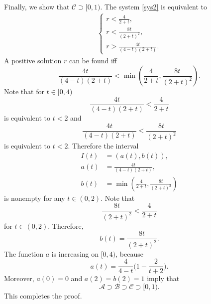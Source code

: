 \documentclass[reqno]{amsart}
\begin{document}
Finally, we show that $\mathcal C \supset [0,1)$.
The system \eqref{sys2} is equivalent to
	\begin{align}\label{sys4}
	\begin{cases}
	r <   \frac{4}{2+t},\\
	r < \frac{8t}{(2+t)^2},\\
	r > \frac{4t}{(4-t)(2+t)}.
	\end{cases}
	\end{align}
 A positive solution $r$ can be found iff
	\[
	\frac{4t}{(4-t)(2+t)} < \min \left(\frac{4}{2+t}, \frac{8t}{(2+t)^2}  \right) .
	\]
Note that for $t \in [0,4)$
	\[
	\frac{4t}{(4-t)(2+t)} < \frac{4}{2+t}
	\]
is equivalent to $t <2$ and
	\[
	\frac{4t}{(4-t)(2+t)} < \frac{8t}{(2+t)^2}
	\]
is equivalent to $t <2.$
Therefore the interval
	\begin{align*}
	I(t) &= (a(t),b(t)), \\
	a(t) &= \frac{4t}{(4-t)(2+t)} , \\
	b(t) &= \min \left(\frac{4}{2+t}, \frac{8t}{(2+t)^2}  \right) 
	\end{align*}
is nonempty for any $t \in (0,2).$ Note that
	\[
	\frac{8t}{(2+t)^2} < \frac{4}{2+t}
	\]
for $t \in (0,2).$ Therefore,
	\[
	b(t) = \frac{8t}{(2+t)^2}.
	\]
The function $a$ is increasing on $[0,4)$, because
	\[
	a(t)
	= \frac{4}{4-t}\bigg( 1 - \frac{2}{t+2} \bigg).
	\]
Moreover, $a(0)=0 $ and $ a(2)=b(2)=1$ imply that 
	\[
	\mathcal{A} \supset \mathcal{B} \supset \mathcal{C} \supset [0,1).
	\]
This completes the proof.


%
%

%
%


%
%
\end{document}
